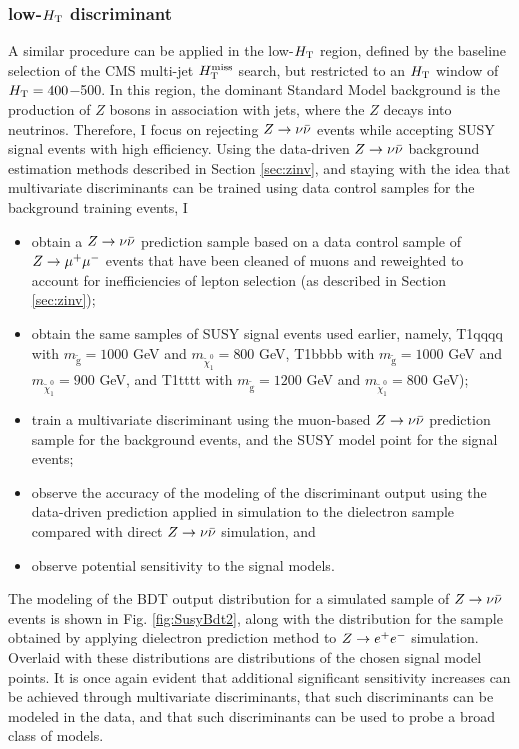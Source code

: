 \subsubsection{low-$\Ht$ discriminant}
A similar procedure can be applied in the low-$\Ht$ region, defined by the baseline selection of the CMS multi-jet $\mht$ search, but restricted to an $\Ht$ window of $\Ht=400$$-$500. In this region, the dominant Standard Model background is the production of $Z$ bosons in association with jets, where the $Z$ decays into neutrinos. Therefore, I focus on rejecting $\zinv$ events while accepting SUSY signal events with high efficiency. Using the data-driven $\zinv$ background estimation methods described in Section \ref{sec:zinv}, and staying with the idea that multivariate discriminants can be trained using data control samples for the background training events, I
\begin{itemize}
\item obtain a $\zinv$ prediction sample based on a data control sample of $\zmumu$ events that have been cleaned of muons and reweighted to account for inefficiencies of lepton selection (as described in Section \ref{sec:zinv});
\item obtain the same samples of SUSY signal events used earlier, namely, T1qqqq with $m_{\tilde{\text{g}}}=1000$ GeV and $m_{\tilde{\chi}^{0}_{1}}=800$ GeV,  T1bbbb with $m_{\tilde{\text{g}}}=1000$ GeV and $m_{\tilde{\chi}^{0}_{1}}=900$ GeV, and T1tttt with $m_{\tilde{\text{g}}}=1200$ GeV and $m_{\tilde{\chi}^{0}_{1}}=800$ GeV);
\item train a multivariate discriminant using the muon-based $\zinv$ prediction sample for the background events, and the  SUSY model point for the signal events;
\item observe the accuracy of the modeling of the discriminant output using the data-driven prediction applied in simulation to the dielectron sample compared with direct $\zinv$ simulation, and
\item observe potential sensitivity to the signal models.
\end{itemize}
The modeling of the BDT output distribution for a simulated sample of $\zinv$ events is shown in Fig. \ref{fig:SusyBdt2}, along with the distribution for the sample obtained by applying dielectron prediction method to $\zee$ simulation. Overlaid with these distributions are distributions of the chosen signal model points. It is once again evident that additional significant sensitivity increases can be achieved through multivariate discriminants, that such discriminants can be modeled in the data, and that such discriminants can be used to probe a broad class of models.
$$
